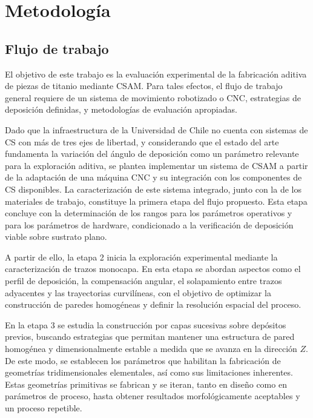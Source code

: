 \chapter{Metodología}

\section{Flujo de trabajo}

El objetivo de este trabajo es la evaluación experimental de la fabricación aditiva de piezas de titanio mediante CSAM. Para tales efectos, el flujo de trabajo general requiere de un sistema de movimiento robotizado o CNC, estrategias de deposición definidas, y metodologías de evaluación apropiadas.

Dado que la infraestructura de la Universidad de Chile no cuenta con sistemas de CS con más de tres ejes de libertad, y considerando que el estado del arte fundamenta la variación del ángulo de deposición como un parámetro relevante para la exploración aditiva, se plantea implementar un sistema de CSAM a partir de la adaptación de una máquina CNC y su integración con los componentes de CS disponibles. La caracterización de este sistema integrado, junto con la de los materiales de trabajo, constituye la primera etapa del flujo propuesto. Esta etapa concluye con la determinación de los rangos para los parámetros operativos y para los parámetros de hardware, condicionado a la verificación de deposición viable sobre sustrato plano.

A partir de ello, la etapa 2 inicia la exploración experimental mediante la caracterización de trazos monocapa. En esta etapa se abordan aspectos como el perfil de deposición, la compensación angular, el solapamiento entre trazos adyacentes y las trayectorias curvilíneas, con el objetivo de optimizar la construcción de paredes homogéneas y definir la resolución espacial del proceso.

En la etapa 3 se estudia la construcción por capas sucesivas sobre depósitos previos, buscando estrategias que permitan mantener una estructura de pared homogénea y dimensionalmente estable a medida que se avanza en la dirección $Z$. De este modo, se establecen los parámetros que habilitan la fabricación de geometrías tridimensionales elementales, así como sus limitaciones inherentes. Estas geometrías primitivas se fabrican y se iteran, tanto en diseño como en parámetros de proceso, hasta obtener resultados morfológicamente aceptables y un proceso repetible.

